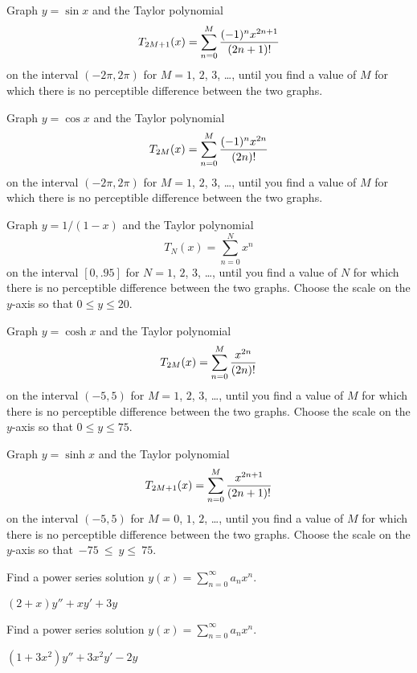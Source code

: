 \documentclass{ximera}
\begin{document}
\begin{problem}\label{exer:7.1.6}  
Graph $y=\sin x$ and the Taylor polynomial
$$
T_{2M+1}(x)=\sum_{n=0}^M{(-1)^nx^{2n+1}\over(2n+1)!}
$$
on the interval $(-2\pi,2\pi)$ for $M=1$, $2$, $3$, \dots, until you find
a value of $M$ for which there is no perceptible difference between the
two graphs.
\end{problem}


\begin{problem}\label{exer:7.1.7}  
Graph $y=\cos x$ and the Taylor polynomial
$$
T_{2M}(x)=\sum_{n=0}^M{(-1)^nx^{2n}\over(2n)!}
$$
on the interval $(-2\pi,2\pi)$ for $M=1$, $2$, $3$, \dots, until you find a
value of $M$ for which there is no perceptible difference between the
two graphs.
\end{problem}

\begin{problem}\label{exer:7.1.8}  
Graph $y=1/(1-x)$ and the Taylor polynomial
$$
T_N(x)=\sum_{n=0}^Nx^n
$$
on the interval $[0,.95]$ for $N=1$, $2$, $3$, \dots, until you find a
value of $N$ for which there is no perceptible difference between the
two graphs. Choose the scale on the $y$-axis so that $0\le y\le20$.
\end{problem}

\begin{problem}\label{exer:7.1.9}  
Graph $y=\cosh x$ and the Taylor polynomial
$$
T_{2M}(x)=\sum_{n=0}^M{x^{2n}\over(2n)!}
$$
on the interval $(-5,5)$ for $M=1$, $2$, $3$, \dots, until you find a
value of $M$ for which there is no perceptible difference between the
two graphs.
 Choose the scale on the $y$-axis so that $0\le y\le75$.
\end{problem}

\begin{problem}\label{exer:7.1.10}  
Graph $y=\sinh x$ and the Taylor polynomial
$$
T_{2M+1}(x)=\sum_{n=0}^M{x^{2n+1}\over(2n+1)!}
$$
on the interval $(-5,5)$ for $M=0$, $1$, $2$, \dots, until you find a
value of $M$ for which there is no perceptible difference between the
two graphs.
 Choose the scale on the $y$-axis so that~$-75~\le~y\le~75$.
 \end{problem}

\begin{problem}\label{exer:7.1.11}
Find a power series solution $y(x)=\sum_{n=0}^\infty a_nx^n$.

$(2+x)y''+xy'+3y$
\end{problem}

\begin{problem}\label{exer:7.1.12}
Find a power series solution $y(x)=\sum_{n=0}^\infty a_nx^n$.

$(1+3x^2)y''+3x^2y'-2y$
\end{problem}
\end{document}
